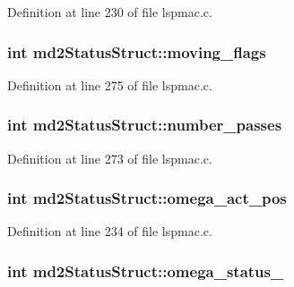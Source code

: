 Definition at line 230 of file lspmac.c.\hypertarget{structmd2StatusStruct_aac82f8e97fa39ea9be7823dd1d308986}{
\subsubsection[{moving\_\-flags}]{\setlength{\rightskip}{0pt plus 5cm}int {\bf md2StatusStruct::moving\_\-flags}}}
\label{structmd2StatusStruct_aac82f8e97fa39ea9be7823dd1d308986}


Definition at line 275 of file lspmac.c.\hypertarget{structmd2StatusStruct_ab3da523bad7b82c1d27780caa24a8b92}{
\subsubsection[{number\_\-passes}]{\setlength{\rightskip}{0pt plus 5cm}int {\bf md2StatusStruct::number\_\-passes}}}
\label{structmd2StatusStruct_ab3da523bad7b82c1d27780caa24a8b92}


Definition at line 273 of file lspmac.c.\hypertarget{structmd2StatusStruct_a6ce303bec89082cae1e9b1fddf6b6c10}{
\subsubsection[{omega\_\-act\_\-pos}]{\setlength{\rightskip}{0pt plus 5cm}int {\bf md2StatusStruct::omega\_\-act\_\-pos}}}
\label{structmd2StatusStruct_a6ce303bec89082cae1e9b1fddf6b6c10}


Definition at line 234 of file lspmac.c.\hypertarget{structmd2StatusStruct_af6cf3cd65b9ef205685a0d970f168907}{
\subsubsection[{omega\_\-status\_\-1}]{\setlength{\rightskip}{0pt plus 5cm}int {\bf md2StatusStruct::omega\_\-status\_}}}
\label{structmd2StatusStruct_af6cf3cd65b9ef205685a0d970f168907}


